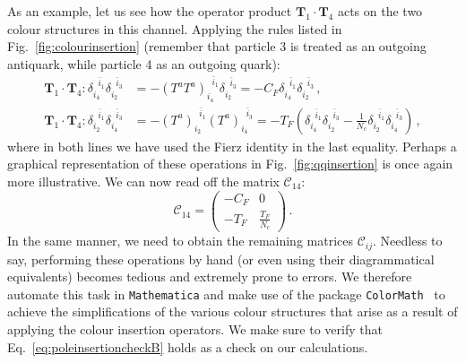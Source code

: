 \documentclass[main.tex]{subfiles}
\begin{document}
As an example, let us see how the operator product $\bm{T}_1 \cdot \bm{T}_4$ acts on the two colour structures in this channel. Applying the rules listed in Fig.~\ref{fig:colourinsertion} (remember that particle 3 is treated as an outgoing antiquark, while particle 4 as an outgoing quark):
\begin{align}
    \bm{T}_1 \cdot \bm{T}_4 : \delta_{i_4}^{\;\;\bar{i}_1} \delta_{i_2}^{\;\;\bar{i}_3} &= -(T^a T^a)_{i_4}^{\;\;\bar{i}_1} \delta_{i_2}^{\;\;\bar{i}_3} = -C_F \delta_{i_4}^{\;\;\bar{i}_1} \delta_{i_2}^{\;\;\bar{i}_3}\,, \\
    \bm{T}_1 \cdot \bm{T}_4 : \delta_{i_2}^{\;\;\bar{i}_1} \delta_{i_4}^{\;\;\bar{i}_3} &= -(T^a)_{i_2}^{\;\;\bar{i}_1} (T^a)_{i_4}^{\;\;\bar{i}_3} = -T_F \left(\delta_{i_4}^{\;\;\bar{i}_1}\delta_{i_2}^{\;\;\bar{i}_3} - \frac{1}{N_c}\delta_{i_2}^{\;\;\bar{i}_1} \delta_{i_4}^{\;\;\bar{i}_3} \right) \,,
\end{align}
where in both lines we have used the Fierz identity in the last equality. Perhaps a graphical representation of these operations in Fig.~\ref{fig:qqinsertion} is once again more illustrative. We can now read off the matrix $\mathcal{C}_{14}$:
\begin{equation}
    \mathcal{C}_{14} = 
    \begin{pmatrix}
    -C_F & 0 \\
    -T_F & \frac{T_F}{N_c}
\end{pmatrix}\,.
\end{equation}
In the same manner, we need to obtain the remaining matrices $\mathcal{C}_{ij}$. Needless to say, performing these operations by hand (or even using their diagrammatical equivalents) becomes tedious and extremely prone to errors. We therefore automate this task in \texttt{Mathematica} and make use of the package \texttt{ColorMath}~\cite{Sjodahl:2012nk} to achieve the simplifications of the various colour structures that arise as a result of applying the colour insertion operators. We make sure to verify that Eq.~\ref{eq:poleinsertioncheckB} holds as a check on our calculations.
\end{document}
